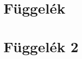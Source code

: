 \documentclass[twocolumn]{book}
\begin{document}
\section{Függelék}
\subsection{}
\hulipsum[1]
\subsection{}
\hulipsum[1]
\section{Függelék 2}
\subsection{}
\hulipsum[1]
\subsection{}
\hulipsum[1]
\clearpage
\quote
\hulipsum[1-2]
\clearpage
\quotation
\hulipsum[1-2]
\clearpage
\begin{verse}
\hulipsum[1-2]
\end{verse}
\end{document}
